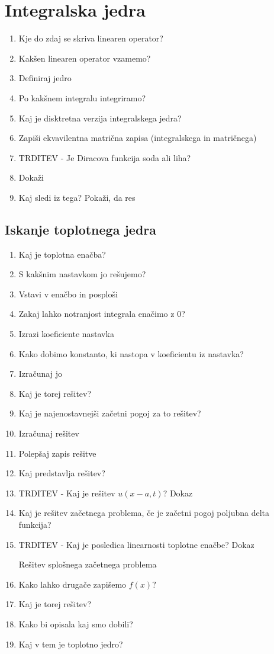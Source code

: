 \documentclass{article}
\begin{document}
    \section{Integralska jedra}
    \begin{enumerate}
        \item Kje do zdaj se skriva linearen operator?
        \item Kakšen linearen operator vzamemo?
        \item Definiraj jedro
        \item Po kakšnem integralu integriramo?
        \item Kaj je disktretna verzija integralskega jedra?
        \item Zapiši ekvavilentna matrična zapisa (integralskega in matričnega)
        \item TRDITEV - Je Diracova funkcija soda ali liha? 
        \item Dokaži
        \item Kaj sledi iz tega? Pokaži, da res
    \end{enumerate}

    \subsection{Iskanje toplotnega jedra}
    \begin{enumerate}
        \item Kaj je toplotna enačba?
        \item S kakšnim nastavkom jo rešujemo?
        \item Vstavi v enačbo in posploši
        \item Zakaj lahko notranjost integrala enačimo z 0?
        \item Izrazi koeficiente nastavka
        \item Kako dobimo konstanto, ki nastopa v koeficientu iz nastavka?
        \item Izračunaj jo
        \item Kaj je torej rešitev?
        \item Kaj je najenostavnejši začetni pogoj za to rešitev?
        \item Izračunaj rešitev
        \item Polepšaj zapis rešitve
        \item Kaj predstavlja rešitev?
        \item TRDITEV - Kaj je rešitev $u(x - a, t)$? Dokaz
        \item Kaj je rešitev začetnega problema, če je začetni pogoj poljubna delta funkcija?
        \item TRDITEV - Kaj je posledica linearnosti toplotne enačbe? Dokaz 
        
        Rešitev splošnega začetnega problema 
        \item Kako lahko drugače zapišemo $f(x)?$
        \item Kaj je torej rešitev?
        \item Kako bi opisala kaj smo dobili?
        \item Kaj v tem je toplotno jedro?
    \end{enumerate}
\end{document}

